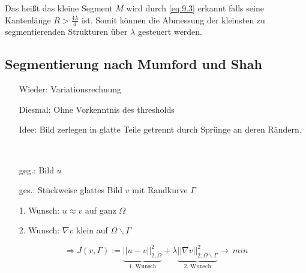 \documentclass{article}
\theoremstyle{plain}
\theoremstyle{definition}
\numberwithin{equation}{section}
\newcommand{\norm}[1] {
\left|\left| #1 \right|\right|
}
\newcommand{\quo}[1] {
\glqq #1 \grqq
}
\begin{document}
Das heißt das kleine Segment $M$ wird durch \ref{eq.9.3} \quo{erkannt} falls seine Kantenlänge $R>\frac{4 \lambda}{d}$ ist. Somit können die Abmessung der kleinsten zu segmentierenden Strukturen über $\lambda$ gesteuert werden.

\subsection{Segmentierung nach Mumford und Shah}

\begin{minipage}{.65\textwidth}
    \begin{enumerate}
        \item[Wieder:] Variationsrechnung
        \item[Diesmal:] Ohne Vorkenntnis des thresholds
        \item[Idee:] Bild zerlegen in \quo{glatte} Teile getrennt durch Sprünge an deren Rändern.
        \item[] \
        \item[geg.:] Bild $u$
        \item[ges.:] Stückweise glattes Bild $v$ mit Randkurve $\Gamma$
    \end{enumerate}
    \begin{enumerate}
        \item[1. Wunsch:] $u \approx v$ auf ganz $\Omega$
        \item[2. Wunsch:] $\nabla v$ klein auf $\Omega \backslash \Gamma$
    \end{enumerate}
\end{minipage}%
\begin{minipage}{0.3\textwidth}
\begin{center}
\end{center}
\end{minipage}

\[\Rightarrow J(v,\Gamma) := \underbrace{\norm{u-v}_{2,\Omega}^2}_{1. \text{ Wunsch}}  + \lambda \underbrace{\norm{\nabla v}_{2,\Omega \backslash \Gamma}^2}_{2. \text{ Wunsch}} \to \ min \]
\end{document}
